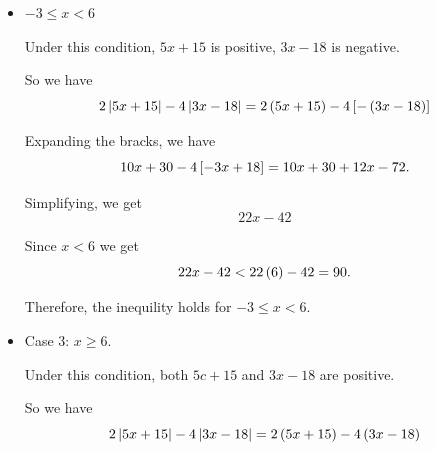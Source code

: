 \begin{itemize}
\begin{solution}
\begin{itemize}
        Expanding the brackets, we have 
        \begin{equation*}
            -10x - 30 + 12x - 72. 
        \end{equation*}

        Adding all the terms together, we get 
        \begin{equation*}
           2x - 102 
        \end{equation*}

        Since we assume $x < -3$, we get 
        \begin{equation*}
            2x -102 < 2\paren{-3}- 102 = -6 - 102 = -108 \leq 90. 
        \end{equation*}

        Thus, this statement holds true.  

        \item $-3 \leq x < 6$
        
        Under this condition, $5x + 15$ is positive, $3x - 18$ is negative. 

        So we have 
        \begin{equation*}
            2\left|5x + 15\right| - 4\left|3x - 18\right| = 2\left(5x + 15\right) - 4 \left[-\left(3x - 18\right)\right]
        \end{equation*}

        Expanding the bracks, we have 
        \begin{equation*}
            10x + 30 - 4\left[-3x + 18\right] = 10x + 30 + 12x - 72. 
        \end{equation*}

        Simplifying, we get 
        \begin{equation*}
            22x - 42
        \end{equation*}

        Since $x < 6$ we get 
        \begin{equation*}
            22x - 42 < 22\left(6\right) - 42 = 90. 
        \end{equation*}

        Therefore, the inequility holds for $-3 \leq x < 6$. 

        \item  Case 3: $x \geq 6$. 
        
        Under this condition, both $5c + 15$ and $3x - 18$ are positive. 

        So we have 
        \begin{equation*}
            2\left|5x + 15\right| - 4\left|3x - 18\right| = 2\left(5x + 15\right) - 4 \left(3x - 18\right)
        \end{equation*}


\end{itemize}
\end{solution}
\end{itemize}
